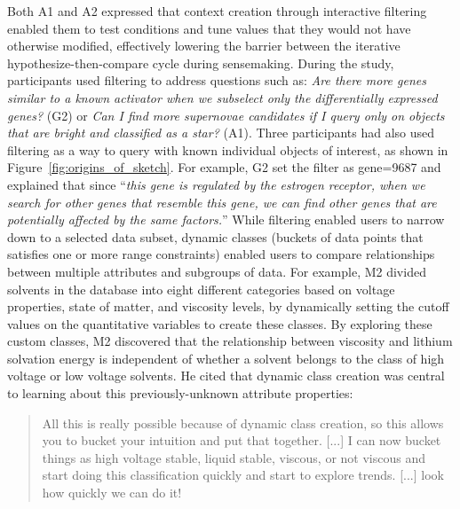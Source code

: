  \npar Both A1 and A2 expressed that context creation through interactive filtering enabled them to test conditions and tune values that they would not have otherwise modified, effectively lowering the barrier between the iterative hypothesize-then-compare cycle during sensemaking.
 During the study, participants used filtering
 to address questions such as:
 \textit{Are there more genes similar
 to a known activator when we subselect
 only the differentially expressed genes?} (G2) or \textit{Can I find more supernovae candidates if I query only on objects that are bright and classified as a star?} (A1). Three participants had also used filtering as a way to query with known individual objects of interest, as shown in  Figure~\ref{fig:origins_of_sketch}. For example, G2 set the filter as gene=9687 and explained that since ``\textit{this gene is regulated by the estrogen receptor, when we search for other genes that resemble this gene, we can find other genes that are potentially affected by the same factors.}''
 \npar While filtering enabled users to
 narrow down to a selected data subset,
 dynamic classes (buckets of data points that satisfies one or more range constraints) enabled users to compare
 relationships between multiple attributes and subgroups of data.
 For example, M2 divided solvents in the database
 into eight different categories based on voltage properties,
 state of matter, and viscosity levels,
 by dynamically setting the cutoff values
 on the quantitative variables to create these classes.
 By exploring these custom classes, M2 discovered that the relationship between viscosity and lithium solvation energy is independent of whether a solvent belongs to the class of high voltage or low voltage solvents. He cited that dynamic class creation was central to learning about this previously-unknown attribute properties:
 \begin{quote}
 All this is really possible because of dynamic class creation, so this allows you to bucket your intuition and put that together. [...] I can now bucket things as high voltage stable, liquid stable, viscous, or not viscous and start doing this classification quickly and start to explore trends. [...] look how quickly we can do it!%
 \end{quote}
